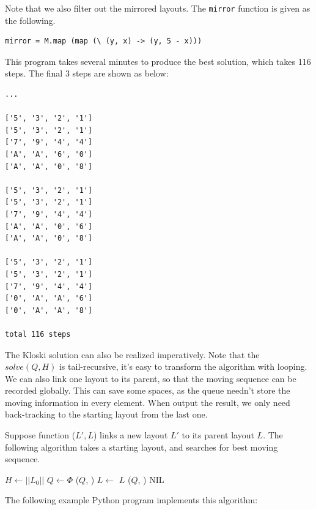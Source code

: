\documentclass[UTF8]{article}
\begin{document}
Note that we also filter out the mirrored layouts. The \texttt{mirror} function is given
as the following.

\lstset{language=Haskell}
\begin{lstlisting}
mirror = M.map (map (\ (y, x) -> (y, 5 - x)))
\end{lstlisting}

This program takes several minutes to produce the best solution, which takes 116 steps.
The final 3 steps are shown as below:

\begin{verbatim}
...

['5', '3', '2', '1']
['5', '3', '2', '1']
['7', '9', '4', '4']
['A', 'A', '6', '0']
['A', 'A', '0', '8']

['5', '3', '2', '1']
['5', '3', '2', '1']
['7', '9', '4', '4']
['A', 'A', '0', '6']
['A', 'A', '0', '8']

['5', '3', '2', '1']
['5', '3', '2', '1']
['7', '9', '4', '4']
['0', 'A', 'A', '6']
['0', 'A', 'A', '8']

total 116 steps
\end{verbatim}

The Kloski solution can also be realized imperatively. Note that the $solve(Q, H)$ is
tail-recursive, it's easy to transform the algorithm with looping. We can also link one layout
to its parent, so that the moving sequence can be recorded globally.
This can save some spaces, as the queue needn't store the moving information in every element.
When output the result, we only need back-tracking to the starting layout from the
last one.

Suppose function ($L', L$) links a new layout $L'$ to its parent layout
$L$.
The following algorithm takes a starting layout, and searches for best moving sequence.

\begin{algorithmic}[1]
  \State $H \gets ||L_0||$
  \State $Q \gets \Phi$
  \State {}($Q$, )
    \State $L \gets $ 
      \State \Return $L$
    \Else
        \State {}($Q$, )
        \State {}
      \EndFor
    \EndIf
  \EndWhile
  \State \Return NIL 
\EndFunction
\end{algorithmic}

The following example Python program implements this algorithm:
\end{document}
